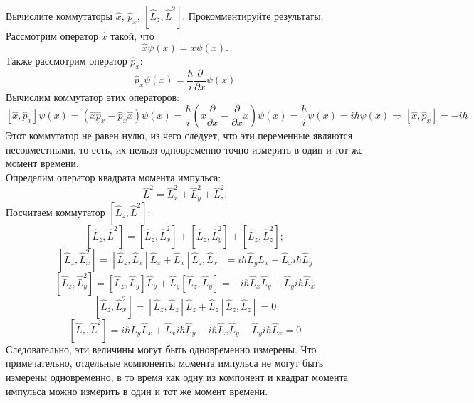 \documentclass[__main__.tex]{subfiles}
\begin{document}
Вычислите коммутаторы $\hat{x}$, $\hat{p}_x$, $\left[\hat{L}_z,\hat{L}^2\right]$. Прокомментируйте результаты.\\ 

Рассмотрим оператор $\hat{x}$ такой, что 
$$
\hat{x}\psi(x)=x\psi(x).
$$
Также рассмотрим оператор $\hat{p}_x$:
$$
\hat{p}_x\psi(x)=\frac{\hbar}{i}\dfrac{\partial}{\partial x}\psi (x)
$$
Вычислим коммутатор этих операторов:
$$
[\hat{x}, \hat{p}_x]\psi(x)=(\hat{x}\hat{p}_x-\hat{p}_x\hat{x})\psi(x)=\frac{\hbar}{i}(x\frac{\partial}{\partial x}-\frac{\partial}{\partial x}x)\psi(x)=\frac{\hbar}{i}\psi(x)=i\hbar\psi(x) \Longrightarrow [\hat{x}, \hat{p}_x]=-i\hbar
$$
Этот коммутатор не равен нулю, из чего следует, что эти переменные являются несовместными, то есть, их нельзя одновременно точно измерить в один и тот же момент времени.\\

Определим оператор квадрата момента импульса:
$$
\hat{L}^2=\hat{L}_x^2+\hat{L}_y^2+\hat{L}_z^2.
$$
Посчитаем коммутатор $\left[\hat{L}_z,\hat{L}^2\right]$:
$$
\left[\hat{L}_z,\hat{L}^2\right] = \left[\hat{L}_z,\hat{L}^2_x\right] + \left[\hat{L}_z,\hat{L}^2_y\right]+\left[\hat{L}_z,\hat{L}^2_z\right];
$$
$$
\left[\hat{L}_z,\hat{L}^2_x\right]= \left[\hat{L}_z,\hat{L}_x\right]\hat{L}_x+\hat{L}_x\left[\hat{L}_z,\hat{L}_x\right]=i\hbar\hat{L}_y\hat{L}_x+\hat{L}_xi\hbar\hat{L}_y
$$
$$
\left[\hat{L}_z,\hat{L}^2_y\right]= \left[\hat{L}_z,\hat{L}_y\right]\hat{L}_y+\hat{L}_y\left[\hat{L}_z,\hat{L}_y\right]=-i\hbar\hat{L}_x\hat{L}_y-\hat{L}_yi\hbar\hat{L}_x
$$
$$
\left[\hat{L}_z,\hat{L}^2_x\right]= \left[\hat{L}_z,\hat{L}_z\right]\hat{L}_z+\hat{L}_z\left[\hat{L}_z,\hat{L}_z\right]=0
$$
$$
\left[\hat{L}_z,\hat{L}^2\right] = i\hbar\hat{L}_y\hat{L}_x+\hat{L}_xi\hbar\hat{L}_y-i\hbar\hat{L}_x\hat{L}_y-\hat{L}_yi\hbar\hat{L}_x = 0
$$
Следовательно, эти величины могут быть одновременно измерены. Что примечательно, отдельные компоненты момента импульса не могут быть измерены одновременно, в то время как одну из компонент и квадрат момента импульса можно измерить в один и тот же момент времени.
\end{document}
